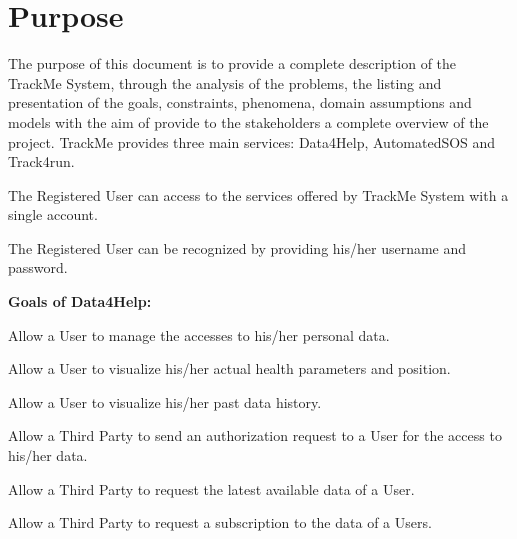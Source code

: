 \section{Purpose}
The purpose of this document is to provide a complete description of the TrackMe System, through the analysis of the problems, the listing and presentation of the goals, constraints, phenomena, domain assumptions and models with the aim of provide to the stakeholders a complete overview of the project. TrackMe provides three main services: Data4Help, AutomatedSOS and Track4run.

\begin{goalList}

\begin{enumerate}[label={[}G\arabic*{]}]

    \item \label{goal:trackme1} The Registered User can access to the services offered by TrackMe System with a single account.
    
    \item \label{goal:trackme2}The Registered User can be recognized by providing his/her username and password.
    
    
\end{enumerate}

\textbf{Goals of Data4Help:}
\begin{enumerate}[label={[}G3.\arabic*{]}]

    \item \label{goal:user1}Allow a User to manage the accesses to his/her personal data.
    \item \label{goal:user2}Allow a User to visualize his/her actual health parameters and position.
    \item \label{goal:user3}Allow a User to visualize his/her past data history.

    \item \label{goal:parties1}Allow a Third Party to send an authorization request to a User for the access to his/her data.
    
    \begin{enumerate}[label={[}G3.4.\arabic*{]}]
        \item \label{goal:parties2}Allow a Third Party to  request the latest available data of a User.
        \item \label{goal:parties3}Allow a Third Party to request a subscription to the data of a Users.
    \end{enumerate}


\end{enumerate}
\end{goalList}
